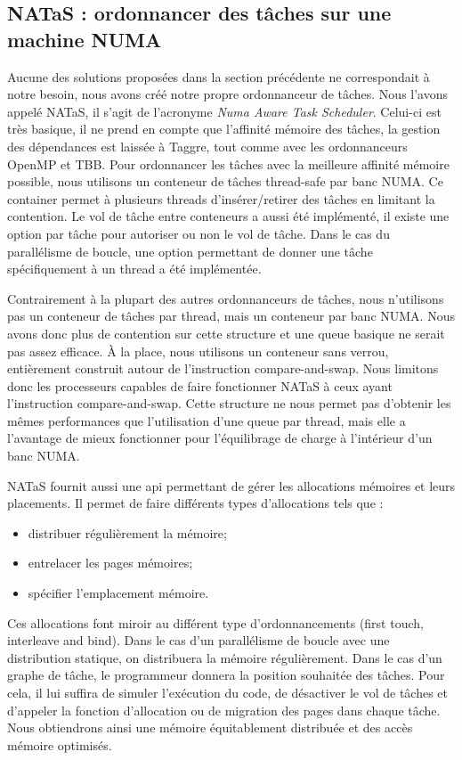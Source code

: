 \subsection{NATaS : ordonnancer des tâches sur une machine NUMA}
Aucune des solutions proposées dans la section précédente ne correspondait à notre besoin, nous avons créé notre propre ordonnanceur de tâches.
%
Nous l'avons appelé NATaS, il s'agit de l'acronyme {\em Numa Aware Task Scheduler}.
%
Celui-ci est très basique, il ne prend en compte que l'affinité mémoire des tâches, la gestion des dépendances est laissée à Taggre, tout comme avec les ordonnanceurs OpenMP et TBB.
%
Pour ordonnancer les tâches avec la meilleure affinité mémoire possible, nous utilisons un conteneur de tâches thread-safe par banc NUMA.
%
Ce container permet à plusieurs threads d'insérer/retirer des tâches en limitant la contention.
%
Le vol de tâche entre conteneurs a aussi été implémenté, il existe une option par tâche pour autoriser ou non le vol de tâche.
%
Dans le cas du parallélisme de boucle, une option permettant de donner une tâche spécifiquement à un thread a été implémentée.

Contrairement à la plupart des autres ordonnanceurs de tâches, nous n'utilisons pas un conteneur de tâches par thread, mais un conteneur par banc NUMA.
%
Nous avons donc plus de contention sur cette structure et une queue basique ne serait pas assez efficace.
%
\`A la place, nous utilisons un conteneur sans verrou, entièrement construit autour de l'instruction compare-and-swap.
%
Nous limitons donc les processeurs capables de faire fonctionner NATaS à ceux ayant l'instruction compare-and-swap.
%
Cette structure ne nous permet pas d'obtenir les mêmes performances que l'utilisation d'une queue par thread, mais elle a l'avantage de mieux fonctionner pour l'équilibrage de charge à l'intérieur d'un banc NUMA.

NATaS fournit aussi une api permettant de gérer les allocations mémoires et leurs placements.
%
Il permet de faire différents types d'allocations tels que :
\begin{itemize}
  \item distribuer régulièrement la mémoire;
  \item entrelacer les pages mémoires;
  \item spécifier l'emplacement mémoire.
\end{itemize}
%
Ces allocations font miroir au différent type d'ordonnancements (first touch, interleave and bind).
%
Dans le cas d'un parallélisme de boucle avec une distribution statique, on distribuera la mémoire régulièrement.
%
Dans le cas d'un graphe de tâche, le programmeur donnera la position souhaitée des tâches.
%
Pour cela, il lui suffira de simuler l'exécution du code, de désactiver le vol de tâches et d'appeler la fonction d'allocation ou de migration des pages dans chaque tâche.
%
Nous obtiendrons ainsi une mémoire équitablement distribuée et des accès mémoire optimisés.


